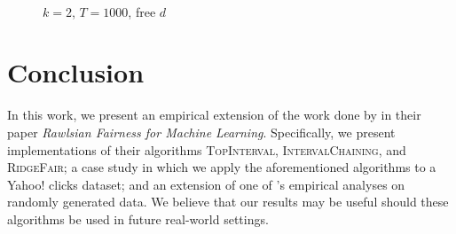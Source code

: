 \documentclass[11pt]{article}
\begin{document}
\begin{figure}[ht!]
{	}
	\\
	\caption{$k=2$, $T=1000$, free $d$}
	\label{fig:free_d}
\end{figure}

\section{Conclusion}

In this work, we present an empirical extension of the work done by  in their paper \textit{Rawlsian Fairness for Machine Learning}. Specifically, we present implementations of their algorithms \textsc{TopInterval}, \textsc{IntervalChaining}, and \textsc{RidgeFair}; a case study in which we apply the aforementioned algorithms to a Yahoo! clicks dataset; and an extension of one of 's empirical analyses on randomly generated data. We believe that our results may be useful should these algorithms be used in future real-world settings. 



\end{document}
